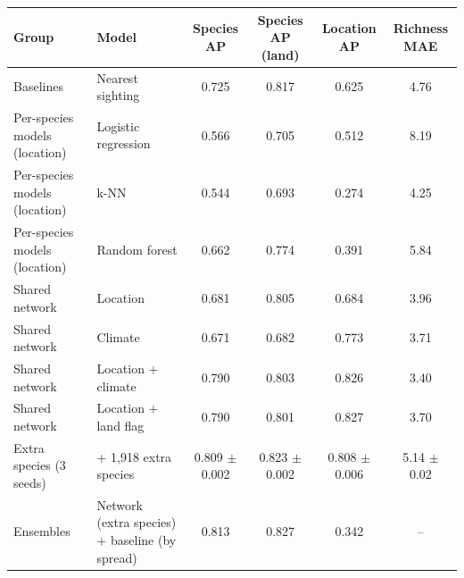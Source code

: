 \begin{tabular}{llcccc}
\toprule
Group & Model & Species AP & Species AP (land) & Location AP & Richness MAE \\
\midrule
Baselines & Nearest sighting & 0.725 & 0.817 & 0.625 & 4.76 \\
Per-species models (location) & Logistic regression & 0.566 & 0.705 & 0.512 & 8.19 \\
Per-species models (location) & k-NN & 0.544 & 0.693 & 0.274 & 4.25 \\
Per-species models (location) & Random forest & 0.662 & 0.774 & 0.391 & 5.84 \\
Shared network & Location & 0.681 & 0.805 & 0.684 & 3.96 \\
Shared network & Climate & 0.671 & 0.682 & 0.773 & 3.71 \\
Shared network & Location + climate & 0.790 & 0.803 & 0.826 & 3.40 \\
Shared network & Location + land flag & 0.790 & 0.801 & 0.827 & 3.70 \\
Extra species (3 seeds) & + 1,918 extra species & 0.809 $\pm$ 0.002 & 0.823 $\pm$ 0.002 & 0.808 $\pm$ 0.006 & 5.14 $\pm$ 0.02 \\
Ensembles & Network (extra species) + baseline (by spread) & 0.813 & 0.827 & 0.342 & – \\
\bottomrule
\end{tabular}